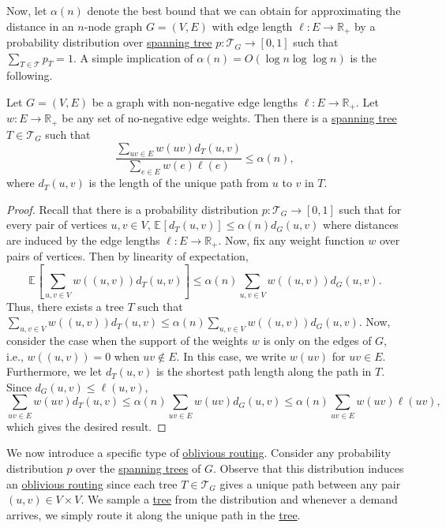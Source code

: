 Now, let \(\alpha (n)\) denote the best bound that we can obtain for approximating the distance in an \(n\)-node graph \(G = (V, E)\) with edge length \(\ell \colon E \to \mathbb{R} _+\) by a probability distribution over \hyperref[def:spanning-tree]{spanning tree} \(p\colon \mathcal{T} _G \to [0, 1]\) such that \(\sum_{T \in \mathcal{T} } p_T = 1\). A simple implication of \(\alpha (n) = O(\log n \log \log n)\) is the following.

\begin{lemma}\label{lma:oblivious-routing-distortion}
	Let \(G = (V, E)\) be a graph with non-negative edge lengths \(\ell \colon E \to \mathbb{R} _+\). Let \(w \colon E \to \mathbb{R} _+\) be any set of no-negative edge weights. Then there is a \hyperref[def:spanning-tree]{spanning tree} \(T \in \mathcal{T} _G\) such that
	\[
		\frac{\sum_{uv \in E} w(uv) d_T(u, v)}{\sum_{e \in E} w(e) \ell (e) }
		\leq \alpha (n),
	\]
	where \(d_T(u, v)\) is the length of the unique path from \(u\) to \(v\) in \(T\).
\end{lemma}
\begin{proof}
	Recall that there is a probability distribution \(p \colon \mathcal{T} _G \to [0, 1]\) such that for every pair of vertices \(u, v \in V\), \(\mathbb{E}_{}[d_T(u, v)] \leq \alpha (n) d_G(u, v)\) where distances are induced by the edge lengths \(\ell \colon E \to \mathbb{R} _+\). Now, fix any weight function \(w\) over pairs of vertices. Then by linearity of expectation,
	\[
		\mathbb{E}_{}\left[\sum_{u, v \in V} w((u, v)) d_T(u, v)\right]
		\leq \alpha (n) \sum_{u, v \in V} w((u, v)) d_G(u, v).
	\]
	Thus, there exists a tree \(T\) such that \(\sum_{u, v \in V} w((u, v)) d_T(u, v) \leq \alpha (n) \sum_{u, v \in V} w((u, v)) d_G(u, v)\). Now, consider the case when the support of the weights \(w\) is only on the edges of \(G\), i.e., \(w((u, v)) = 0\) when \(uv \notin E\). In this case, we write \(w(uv)\) for \(uv \in E\). Furthermore, we let \(d_T(u, v)\) is the shortest path length along the path in \(T\). Since \(d_G(u, v) \leq \ell (u, v)\),
	\[
		\sum_{uv \in E} w(uv) d_T(u, v)
		\leq \alpha (n) \sum_{uv \in E} w(uv) d_G(u, v)
		\leq \alpha (n) \sum_{uv \in E} w(uv) \ell (uv),
	\]
	which gives the desired result.
\end{proof}

We now introduce a specific type of \hyperref[def:oblivious-routing-scheme]{oblivious routing}. Consider any probability distribution \(p\) over the \hyperref[def:spanning-tree]{spanning trees} of \(G\). Observe that this distribution induces an \hyperref[prb:oblivious-routing]{oblivious routing} since each tree \(T \in \mathcal{T} _G\) gives a unique path between any pair \((u, v) \in V \times V\). We sample a \hyperref[def:spanning-tree]{tree} from the distribution and whenever a demand arrives, we simply route it along the unique path in the \hyperref[def:spanning-tree]{tree}.

